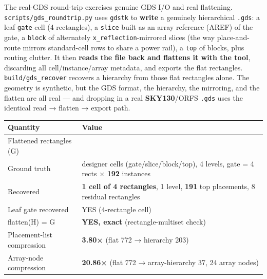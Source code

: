 \documentclass[
  11pt,
]{article}
\newcounter{none} %
\begin{document}
The real-GDS round-trip exercises genuine GDS I/O and real flattening.
\texttt{scripts/gds\_roundtrip.py} uses \texttt{gdstk} to \textbf{write}
a genuinely hierarchical \texttt{.gds}: a leaf \texttt{gate} cell (4
rectangles), a \texttt{slice} built as an array reference (AREF) of the
gate, a \texttt{block} of alternately \texttt{x\_reflection}-mirrored
slices (the way place-and-route mirrors standard-cell rows to share a
power rail), a \texttt{top} of blocks, plus routing clutter. It then
\textbf{reads the file back and flattens it with the tool}, discarding
all cell/instance/array metadata, and exports the flat rectangles.
\texttt{build/gds\_recover} recovers a hierarchy from those flat
rectangles alone. The geometry is synthetic, but the GDS format, the
hierarchy, the mirroring, and the flatten are all real --- and dropping
in a real \textbf{SKY130}/ORFS \texttt{.gds} uses the identical read →
flatten → export path.

{\def\LTcaptype{none} %
\begin{longtable}[]{@{}
  >{\raggedright\arraybackslash}p{}
  >{\raggedright\arraybackslash}p{}@{}}
\toprule\noalign{}
\begin{minipage}[b]{\linewidth}\raggedright
Quantity
\end{minipage} & \begin{minipage}[b]{\linewidth}\raggedright
Value
\end{minipage} \\
\midrule\noalign{}
\endhead
\bottomrule\noalign{}
\endlastfoot
Flattened rectangles (G) & 772 \\
Ground truth & 4 designer cells (gate/slice/block/top), 4 levels, gate =
4 rects × \textbf{192} instances \\
Recovered & \textbf{1 cell of 4 rectangles}, 1 level, \textbf{191} top
placements, 8 residual rectangles \\
Leaf gate recovered & YES (4-rectangle cell) \\
flatten(H) = G & \textbf{YES, exact} (rectangle-multiset check) \\
Placement-list compression & \textbf{3.80×} (flat 772 → hierarchy
203) \\
Array-node compression & \textbf{20.86×} (flat 772 → array-hierarchy 37,
24 array nodes) \\
\end{longtable}
}
\end{document}
